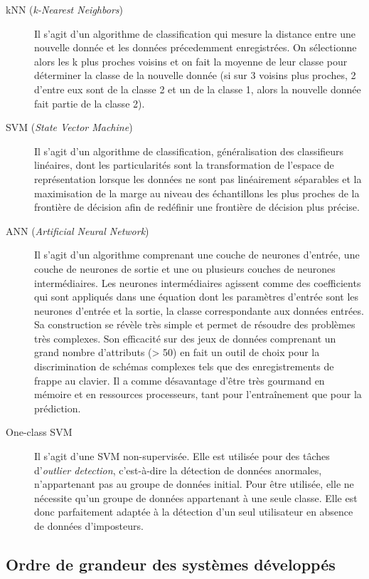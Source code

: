 \begin{description}
  \item[kNN\cite{Hu2008} (\textit{k-Nearest Neighbors})] Il s'agit d'un algorithme de classification qui mesure la distance entre une nouvelle donnée et les données précedemment enregistrées. On sélectionne alors les k plus proches voisins et on fait la moyenne de leur classe pour déterminer la classe de la nouvelle donnée (si sur 3 voisins plus proches, 2 d'entre eux sont de la classe 2 et un de la classe 1, alors la nouvelle donnée fait partie de la classe 2).
  \item[SVM\cite{giotSVM} (\textit{State Vector Machine})] Il s'agit d'un algorithme de classification, généralisation des classifieurs linéaires, dont les particularités sont la transformation de l'espace de représentation lorsque les données ne sont pas linéairement séparables et la maximisation de la marge au niveau des échantillons les plus proches de la frontière de décision afin de redéfinir une frontière de décision plus précise.
  \item[ANN (\textit{Artificial Neural Network})] Il s'agit d'un algorithme comprenant une couche de neurones d'entrée, une couche de neurones de sortie et une ou plusieurs couches de neurones intermédiaires. Les neurones intermédiaires agissent comme des coefficients qui sont appliqués dans une équation dont les paramètres d'entrée sont les neurones d'entrée et la sortie, la classe correspondante aux données entrées. Sa construction se révèle très simple et permet de résoudre des problèmes très complexes. Son efficacité sur des jeux de données comprenant un grand nombre d'attributs (> 50) en fait un outil de choix pour la discrimination de schémas complexes tels que des enregistrements de frappe au clavier. Il a comme désavantage d'être très gourmand en mémoire et en ressources processeurs, tant pour l'entraînement que pour la prédiction.
  \item[One-class SVM\cite{oneclassSVM}] Il s'agit d'une SVM non-supervisée. Elle est utilisée pour des tâches d'\textit{outlier detection}, c'est-à-dire la détection de données anormales, n'appartenant pas au groupe de données initial. Pour être utilisée, elle ne nécessite qu'un groupe de données appartenant à une seule classe. Elle est donc parfaitement adaptée à la détection d'un seul utilisateur en absence de données d'imposteurs.
\end{description}

\subsection{Ordre de grandeur des systèmes développés}

